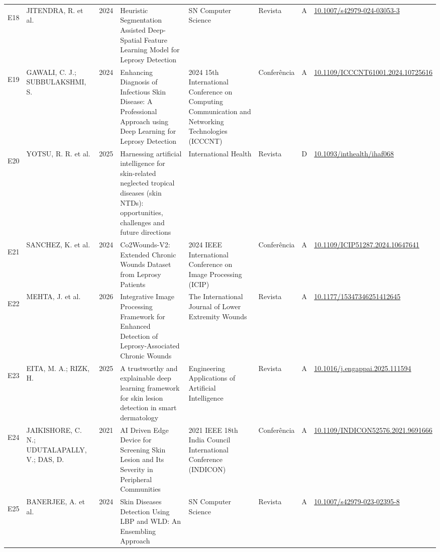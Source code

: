 \begin{longtable}{@{}lp{2.7cm}lp{3.6cm}p{2.7cm}llp{2.1cm}@{}}
\hypertarget{estudo:E18}{}E18 & JITENDRA, R. et al. & 2024 & Heuristic Segmentation Assisted Deep-Spatial Feature Learning Model for Leprosy Detection & SN Computer Science & Revista & A & \href{https://doi.org/10.1007/s42979-024-03053-3}{10.\allowbreak{}1007/\allowbreak{}s42979-024-03053-3} \\
\hypertarget{estudo:E19}{}E19 & GAWALI, C. J.; SUBBULAKSHMI, S. & 2024 & Enhancing Diagnosis of Infectious Skin Disease: A Professional Approach using Deep Learning for Leprosy Detection & 2024 15th International Conference on Computing Communication and Networking Technologies (ICCCNT) & Conferência & A & \href{https://doi.org/10.1109/ICCCNT61001.2024.10725616}{10.\allowbreak{}1109/\allowbreak{}ICCCNT61001.\allowbreak{}2024.\allowbreak{}10725616} \\
\hypertarget{estudo:E20}{}E20 & YOTSU, R. R. et al. & 2025 & Harnessing artificial intelligence for skin-related neglected tropical diseases (skin NTDs): opportunities, challenges and future directions & International Health & Revista & D & \href{https://doi.org/10.1093/inthealth/ihaf068}{10.\allowbreak{}1093/\allowbreak{}inthealth/\allowbreak{}ihaf068} \\
\hypertarget{estudo:E21}{}E21 & SANCHEZ, K. et al. & 2024 & Co2Wounds-V2: Extended Chronic Wounds Dataset from Leprosy Patients & 2024 IEEE International Conference on Image Processing (ICIP) & Conferência & A & \href{https://doi.org/10.1109/ICIP51287.2024.10647641}{10.\allowbreak{}1109/\allowbreak{}ICIP51287.\allowbreak{}2024.\allowbreak{}10647641} \\
\hypertarget{estudo:E22}{}E22 & MEHTA, J. et al. & 2026 & Integrative Image Processing Framework for Enhanced Detection of Leprosy-Associated Chronic Wounds & The International Journal of Lower Extremity Wounds & Revista & A & \href{https://doi.org/10.1177/15347346251412645}{10.\allowbreak{}1177/\allowbreak{}15347346251412645} \\
\hypertarget{estudo:E23}{}E23 & EITA, M. A.; RIZK, H. & 2025 & A trustworthy and explainable deep learning framework for skin lesion detection in smart dermatology & Engineering Applications of Artificial Intelligence & Revista & A & \href{https://doi.org/10.1016/j.engappai.2025.111594}{10.\allowbreak{}1016/\allowbreak{}j.\allowbreak{}engappai.\allowbreak{}2025.\allowbreak{}111594} \\
\hypertarget{estudo:E24}{}E24 & JAIKISHORE, C. N.; UDUTALAPALLY, V.; DAS, D. & 2021 & AI Driven Edge Device for Screening Skin Lesion and Its Severity in Peripheral Communities & 2021 IEEE 18th India Council International Conference (INDICON) & Conferência & A & \href{https://doi.org/10.1109/INDICON52576.2021.9691666}{10.\allowbreak{}1109/\allowbreak{}INDICON52576.\allowbreak{}2021.\allowbreak{}9691666} \\
\hypertarget{estudo:E25}{}E25 & BANERJEE, A. et al. & 2024 & Skin Diseases Detection Using LBP and WLD: An Ensembling Approach & SN Computer Science & Revista & A & \href{https://doi.org/10.1007/s42979-023-02395-8}{10.\allowbreak{}1007/\allowbreak{}s42979-023-02395-8} \\
\end{longtable}
\endgroup
{}


